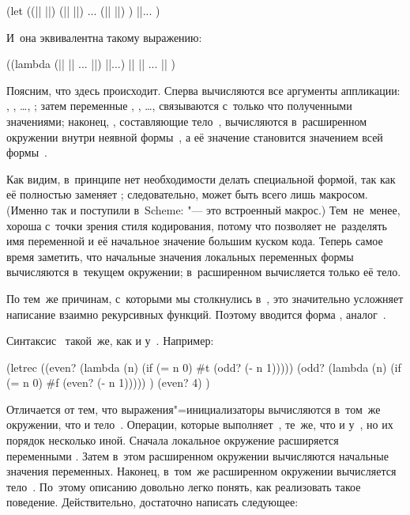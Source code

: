 \begin{code:lisp}
(let ((|| ||)
      (|| ||)
       ...
      (|| ||) )
  ||... )
\end{code:lisp}

\noindent
И~она эквивалентна такому выражению:

\begin{code:lisp}
((lambda (|| || ... ||) ||...)
 || || ... || )
\end{code:lisp}

Поясним, что здесь происходит. Сперва вычисляются все аргументы аппликации:
, , \dots, ;
затем переменные , , \dots,
 связываются с~только что полученными значениями;
наконец, , составляющие тело~, вычисляются в~расширенном
окружении внутри неявной формы~, а её значение становится значением
всей формы~.

Как видим, в~принципе нет необходимости делать  специальной формой, так
как её полностью заменяет ; следовательно,  может быть всего
лишь макросом. (Именно так и поступили в~Scheme:  "--- это встроенный 
макрос.) Тем~не~менее,  хороша с~точки зрения стиля кодирования, потому
что позволяет не~разделять имя переменной и её начальное значение большим куском
кода. Теперь самое время заметить, что начальные значения локальных переменных
формы  вычисляются в~текущем окружении; в~расширенном вычисляется только
её тело.

По тем~же причинам, с~которыми мы столкнулись в~, это значительно
усложняет написание взаимно рекурсивных функций. Поэтому вводится форма
, аналог~.

Синтаксис~ такой~же, как и у~. Например:

\begin{code:lisp}
(letrec ((even? (lambda (n) (if (= n 0) #t (odd? (- n 1)))))
         (odd? (lambda (n) (if (= n 0) #f (even? (- n 1))))) )
  (even? 4) )
\end{code:lisp}

Отличается  от  тем, что выражения"=инициализаторы
вычисляются в~том~же окружении, что и тело~. Операции, которые
выполняет~, те~же, что и у~, но их порядок несколько иной.
Сначала локальное окружение расширяется переменными . Затем в~этом
расширенном окружении вычисляются начальные значения переменных. Наконец,
в~том~же расширенном окружении вычисляется тело~. По~этому описанию
довольно легко понять, как реализовать такое поведение. Действительно,
достаточно написать следующее:

